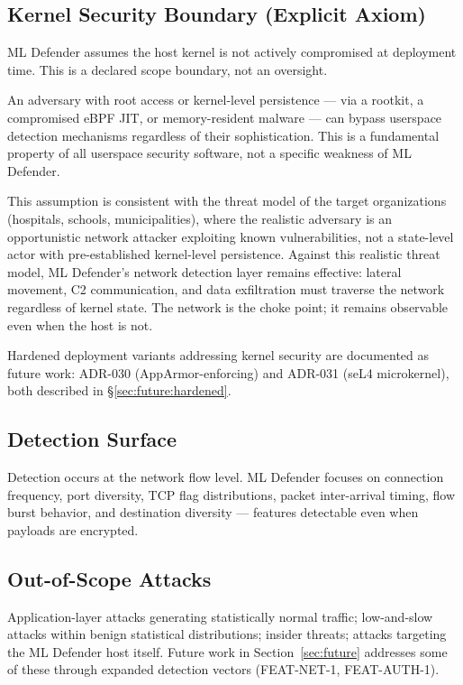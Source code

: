 \documentclass[11pt,a4paper]{article}
\begin{document}
    \subsection{Kernel Security Boundary (Explicit Axiom)}
    \label{sec:threatmodel:kernel}

    ML Defender assumes the host kernel is not actively compromised at deployment time.
    This is a declared scope boundary, not an oversight.

    An adversary with root access or kernel-level persistence --- via a rootkit, a
    compromised eBPF JIT, or memory-resident malware --- can bypass userspace detection
    mechanisms regardless of their sophistication. This is a fundamental property of all
    userspace security software, not a specific weakness of ML Defender.

    This assumption is consistent with the threat model of the target organizations
    (hospitals, schools, municipalities), where the realistic adversary is an
    opportunistic network attacker exploiting known vulnerabilities, not a state-level
    actor with pre-established kernel-level persistence. Against this realistic threat
    model, ML Defender's network detection layer remains effective: lateral movement,
    C2 communication, and data exfiltration must traverse the network regardless of
    kernel state. The network is the choke point; it remains observable even when the
    host is not.

    Hardened deployment variants addressing kernel security are documented as future
    work: ADR-030 (AppArmor-enforcing) and ADR-031 (seL4 microkernel),
    both described in \S\ref{sec:future:hardened}.

    \subsection{Detection Surface}
    Detection occurs at the network flow level. ML Defender focuses on connection frequency,
    port diversity, TCP flag distributions, packet inter-arrival timing, flow burst behavior, and
    destination diversity --- features detectable even when payloads are encrypted.

    \subsection{Out-of-Scope Attacks}
    \label{sec:threatmodel:outofscope}

    Application-layer attacks generating statistically normal traffic; low-and-slow
    attacks within benign statistical distributions; insider threats; attacks
    targeting the ML Defender host itself. Future work in
    Section~\ref{sec:future} addresses some of these through expanded detection
    vectors (FEAT-NET-1, FEAT-AUTH-1).
\end{document}
